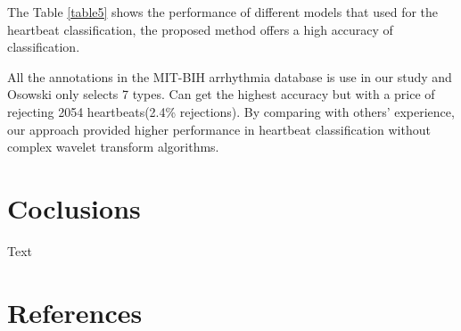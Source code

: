 \documentclass{bmcart}
\begin{document}
The Table \ref{table5} shows the performance of different models that used for the heartbeat classification, the proposed method offers a high accuracy of classification. 

All the annotations in the MIT-BIH arrhythmia database is use in our study and Osowski\cite{Osowski} only selects 7 types. Can\cite{Can} get the highest accuracy but with a price of rejecting 2054 heartbeats(2.4\% rejections). By comparing with others' experience, our approach provided higher performance in heartbeat classification without complex wavelet transform algorithms. 



\section*{Coclusions}
Text

\section*{References}
\end{document}
